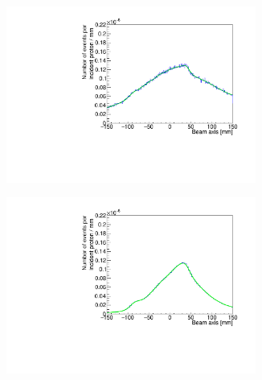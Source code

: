 \begin{figure}
\begin{subfigure}[b]{.5\textwidth}
\centering
\includegraphics[width=0.9\textwidth]{03_GraphicFiles/chapter4_HTsimu/Results_forHadronthPaper/RefProfile_lineCone_plusNurbs.pdf}
\caption{}
\label{chap4::fig::fig_Results_Estimation_Camera_Profil_highStat_CC_simulation_Hadronth_LineCone}
\end{subfigure}
\begin{subfigure}[b]{.5\textwidth}
\centering
\includegraphics[width=0.9\textwidth]{03_GraphicFiles/chapter4_HTsimu/Results_forHadronthPaper/RefProfile_MLEM_plusNurbs.pdf}
\caption{}
\label{chap4::fig::fig_Results_Estimation_Camera_Profil_highStat_CC_simulation_Hadronth_MLEM}
\end{subfigure}
\begin{subfigure}[b]{.5\textwidth}
\centering

\end{subfigure}
\end{figure}
